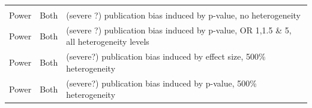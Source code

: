 \documentclass[
  english,
  doc,floatsintext,draftall]{apa6}
\begin{document}
\begin{longtable}[]{@{}lll@{}}
\begin{minipage}[t]{0.30\columnwidth}
\end{minipage}\tabularnewline
\begin{minipage}[t]{0.30\columnwidth}\raggedright
Power\strut
\end{minipage} & \begin{minipage}[t]{0.30\columnwidth}\raggedright
Both\strut
\end{minipage} & \begin{minipage}[t]{0.30\columnwidth}\raggedright
(severe ?) publication bias induced by p-value, no heterogeneity\strut
\end{minipage}\tabularnewline
\begin{minipage}[t]{0.30\columnwidth}\raggedright
Power\strut
\end{minipage} & \begin{minipage}[t]{0.30\columnwidth}\raggedright
Both\strut
\end{minipage} & \begin{minipage}[t]{0.30\columnwidth}\raggedright
(severe ?) publication bias induced by p-value, OR 1,1.5 \& 5, all heterogeneity levels\strut
\end{minipage}\tabularnewline
\begin{minipage}[t]{0.30\columnwidth}\raggedright
Power\strut
\end{minipage} & \begin{minipage}[t]{0.30\columnwidth}\raggedright
Both\strut
\end{minipage} & \begin{minipage}[t]{0.30\columnwidth}\raggedright
(severe?) publication bias induced by effect size, 500\% heterogeneity\strut
\end{minipage}\tabularnewline
\begin{minipage}[t]{0.30\columnwidth}\raggedright
Power\strut
\end{minipage} & \begin{minipage}[t]{0.30\columnwidth}\raggedright
Both\strut
\end{minipage} & \begin{minipage}[t]{0.30\columnwidth}\raggedright
(severe?) publication bias induced by p-value, 500\% heterogeneity\strut
\end{minipage}\tabularnewline
\bottomrule
\end{longtable}
\end{document}
